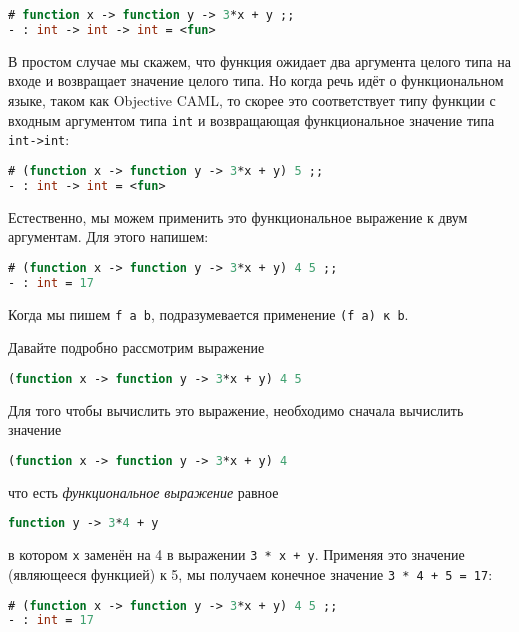 \begin{lstlisting}[language=OCaml]
# function x -> function y -> 3*x + y ;;
- : int -> int -> int = <fun>
\end{lstlisting}

В простом случае мы скажем, что функция ожидает два аргумента целого типа на
входе и возвращает значение целого типа. Но когда речь идёт о функциональном
языке, таком как Objective CAML, то скорее это соответствует типу функции с
входным аргументом типа \texttt{int} и возвращающая функциональное значение типа
\texttt{int->int}:

\begin{lstlisting}[language=OCaml]
# (function x -> function y -> 3*x + y) 5 ;;
- : int -> int = <fun>
\end{lstlisting}

Естественно, мы можем применить это функциональное выражение к двум аргументам.
Для этого напишем:

\begin{lstlisting}[language=OCaml]
# (function x -> function y -> 3*x + y) 4 5 ;;
- : int = 17
\end{lstlisting}

Когда мы пишем \texttt{f a b}, подразумевается применение \texttt{(f a) к b}.

Давайте подробно рассмотрим выражение

\begin{lstlisting}[language=OCaml]
(function x -> function y -> 3*x + y) 4 5
\end{lstlisting}

Для того чтобы вычислить это выражение, необходимо сначала вычислить значение

\begin{lstlisting}[language=OCaml]
(function x -> function y -> 3*x + y) 4
\end{lstlisting}

что есть {\it функциональное выражение} равное

\begin{lstlisting}[language=OCaml]
function y -> 3*4 + y
\end{lstlisting}

в котором \texttt{x} заменён на 4 в выражении \texttt{3 * x + y}. Применяя это
значение (являющееся функцией) к 5, мы получаем конечное значение \texttt{3 * 4
+ 5 = 17}:

\begin{lstlisting}[language=OCaml]
# (function x -> function y -> 3*x + y) 4 5 ;;
- : int = 17
\end{lstlisting}

